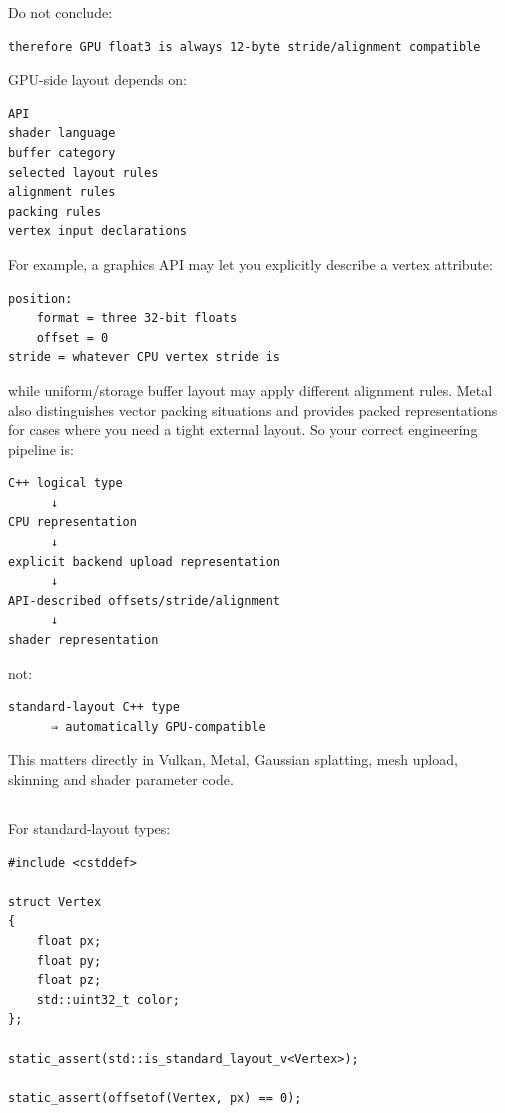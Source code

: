 Do not conclude:

\begin{verbatim}
therefore GPU float3 is always 12-byte stride/alignment compatible
\end{verbatim}

GPU-side layout depends on:

\begin{verbatim}
API
shader language
buffer category
selected layout rules
alignment rules
packing rules
vertex input declarations
\end{verbatim}

For example, a graphics API may let you explicitly describe a vertex attribute:

\begin{verbatim}
position:
    format = three 32-bit floats
    offset = 0
stride = whatever CPU vertex stride is
\end{verbatim}

while uniform/storage buffer layout may apply different alignment rules. Metal also distinguishes vector packing situations and provides packed representations for cases where you need a tight external layout. So your correct engineering pipeline is:

\begin{verbatim}
C++ logical type
      ↓
CPU representation
      ↓
explicit backend upload representation
      ↓
API-described offsets/stride/alignment
      ↓
shader representation
\end{verbatim}

not:

\begin{verbatim}
standard-layout C++ type
      ⇒ automatically GPU-compatible
\end{verbatim}

This matters directly in Vulkan, Metal, Gaussian splatting, mesh upload, skinning and shader parameter code.

\subsection{\texorpdfstring{}{}}\label{01-foundations-i-ch003-offsetof}

\hypertarget{01-foundations-i-ch003-offsetof}{}

For standard-layout types:

\begin{verbatim}
#include <cstddef>

struct Vertex
{
    float px;
    float py;
    float pz;
    std::uint32_t color;
};

static_assert(std::is_standard_layout_v<Vertex>);

static_assert(offsetof(Vertex, px) == 0);
\end{verbatim}

